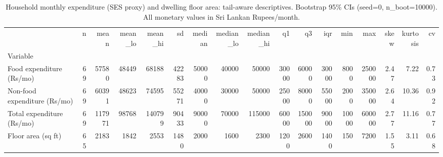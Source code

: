 \begin{table}
\caption{Household monthly expenditure (SES proxy) and dwelling floor area: tail-aware descriptives. Bootstrap 95\% CIs (seed=0, n_boot=10000). All monetary values in Sri Lankan Rupees/month.}
\label{tab:ses_descriptives}
\begin{tabular}{lrrrrrrrrrrrrrrrr}
\toprule
 & n & mean & mean\_lo & mean\_hi & sd & median & median\_lo & median\_hi & q1 & q3 & iqr & min & max & skew & kurtosis & cv \\
Variable &  &  &  &  &  &  &  &  &  &  &  &  &  &  &  &  \\
\midrule
Food expenditure (Rs/mo) & 69 & 57580 & 48449 & 68188 & 42283 & 50000 & 40000 & 50000 & 30000 & 60000 & 30000 & 8000 & 250000 & 2.47 & 7.22 & 0.73 \\
Non-food expenditure (Rs/mo) & 69 & 60391 & 48623 & 74595 & 55271 & 40000 & 30000 & 50000 & 25000 & 80000 & 55000 & 2000 & 350000 & 2.64 & 10.36 & 0.92 \\
Total expenditure (Rs/mo) & 69 & 117971 & 98768 & 140799 & 90433 & 90000 & 70000 & 115000 & 60000 & 150000 & 90000 & 10000 & 600000 & 2.77 & 11.16 & 0.77 \\
Floor area (sq ft) & 65 & 2183 & 1842 & 2553 & 1480 & 2000 & 1600 & 2300 & 1200 & 2600 & 1400 & 150 & 7200 & 1.55 & 3.11 & 0.68 \\
\bottomrule
\end{tabular}
\end{table}
